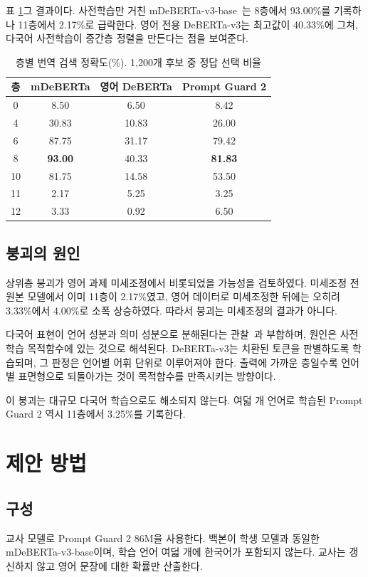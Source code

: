 \documentclass[twocolumn, 10pt]{article}
\begin{document}
표 \ref{tab:layer}\는 그 결과이다.
사전학습만 거친 mDeBERTa-v3-base~\cite{he:iclr2023}는 8층에서 93.00\%를 기록하나 11층에서 2.17\%로 급락한다.
영어 전용 DeBERTa-v3는 최고값이 40.33\%에 그쳐, 다국어 사전학습이 중간층 정렬을 만든다는 점을 보여준다.

\begin{table}[t]
\caption{층별 번역 검색 정확도(\%). 1,200개 후보 중 정답 선택 비율}
\label{tab:layer}
\begin{center}
\begin{tabular}{c|c|c|c}
\hline
층 & mDeBERTa & 영어 DeBERTa & Prompt Guard 2 \\
\hline
0  & 8.50  & 6.50  & 8.42 \\
4  & 30.83 & 10.83 & 26.00 \\
6  & 87.75 & 31.17 & 79.42 \\
8  & \textbf{93.00} & 40.33 & \textbf{81.83} \\
10 & 81.75 & 14.58 & 53.50 \\
11 & 2.17  & 5.25  & 3.25 \\
12 & 3.33  & 0.92  & 6.50 \\
\hline
\end{tabular}
\end{center}
\end{table}

\subsection{붕괴의 원인}
상위층 붕괴가 영어 과제 미세조정에서 비롯되었을 가능성을 검토하였다.
미세조정 전 원본 모델에서 이미 11층이 2.17\%였고, 영어 데이터로 미세조정한 뒤에는 오히려 3.33\%에서 4.00\%로 소폭 상승하였다.
따라서 붕괴는 미세조정의 결과가 아니다.

다국어 표현이 언어 성분과 의미 성분으로 분해된다는 관찰~\cite{libovicky:csl2020}과 부합하며, 원인은 사전학습 목적함수에 있는 것으로 해석된다.
DeBERTa-v3는 치환된 토큰을 판별하도록 학습되며, 그 판정은 언어별 어휘 단위로 이루어져야 한다.
출력에 가까운 층일수록 언어별 표면형으로 되돌아가는 것이 목적함수를 만족시키는 방향이다.

이 붕괴는 대규모 다국어 학습으로도 해소되지 않는다.
여덟 개 언어로 학습된 Prompt Guard 2 역시 11층에서 3.25\%를 기록한다.

\section{제안 방법}

\subsection{구성}
교사 모델로 Prompt Guard 2 86M을 사용한다.
백본이 학생 모델과 동일한 mDeBERTa-v3-base이며, 학습 언어 여덟 개에 한국어가 포함되지 않는다.
교사는 갱신하지 않고 영어 문장에 대한 확률만 산출한다.
\end{document}

